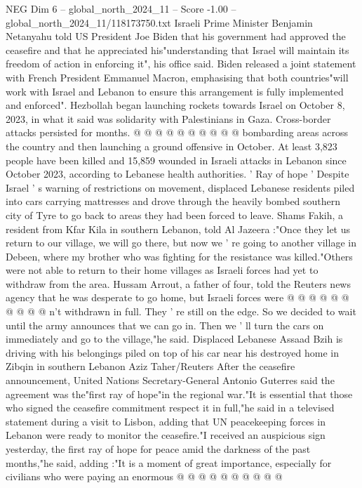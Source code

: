 \begin{textsample}{NEG Dim 6 – global\_north\_2024\_11 – Score -1.00 – global\_north\_2024\_11/118173750.txt}
Israeli Prime Minister Benjamin Netanyahu told US President Joe Biden that his government had approved the ceasefire and that he appreciated his"understanding that Israel will maintain its freedom of action in enforcing it", his office said.
Biden released a joint statement with French President Emmanuel Macron, emphasising that both countries"will work with Israel and Lebanon to ensure this arrangement is fully implemented and enforced".
Hezbollah began launching rockets towards Israel on October 8, 2023, in what it said was solidarity with Palestinians in Gaza.
Cross-border attacks persisted for months. @ @ @ @ @ @ @ @ @ @ bombarding areas across the country and then launching a ground offensive in October.
At least 3,823 people have been killed and 15,859 wounded in Israeli attacks in Lebanon since October 2023, according to Lebanese health authorities. ' Ray of hope ' Despite Israel ' s warning of restrictions on movement, displaced Lebanese residents piled into cars carrying mattresses and drove through the heavily bombed southern city of Tyre to go back to areas they had been forced to leave.
Shams Fakih, a resident from Kfar Kila in southern Lebanon, told Al Jazeera :"Once they let us return to our village, we will go there, but now we ' re going to another village in Debeen, where my brother who was fighting for the resistance was killed."Others were not able to return to their home villages as Israeli forces had yet to withdraw from the area.
Hussam Arrout, a father of four, told the Reuters news agency that he was desperate to go home, but Israeli forces were @ @ @ @ @ @ @ @ @ @ n't withdrawn in full.
They ' re still on the edge.
So we decided to wait until the army announces that we can go in.
Then we ' ll turn the cars on immediately and go to the village,"he said.
Displaced Lebanese Assaad Bzih is driving with his belongings piled on top of his car near his destroyed home in Zibqin in southern Lebanon Aziz Taher/Reuters After the ceasefire announcement, United Nations Secretary-General Antonio Guterres said the agreement was the"first ray of hope"in the regional war."It is essential that those who signed the ceasefire commitment respect it in full,"he said in a televised statement during a visit to Lisbon, adding that UN peacekeeping forces in Lebanon were ready to monitor the ceasefire."I received an auspicious sign yesterday, the first ray of hope for peace amid the darkness of the past months,"he said, adding :"It is a moment of great importance, especially for civilians who were paying an enormous @ @ @ @ @ @ @ @ @ @

\end{textsample}
